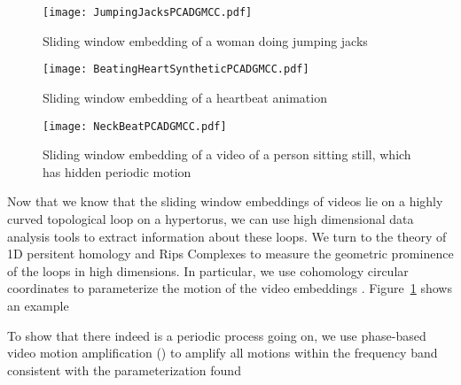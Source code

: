 \documentclass[a4paper,UKenglish]{lipics}
\begin{document}
\begin{figure}[]
	\centering
	\texttt{[image: JumpingJacksPCADGMCC.pdf]}
	\caption{Sliding window embedding of a woman doing jumping jacks}
	\label{fig:JumpingJacks}
\end{figure}

\begin{figure}[]
	\centering
	\texttt{[image: BeatingHeartSyntheticPCADGMCC.pdf]}
	\caption{Sliding window embedding of a heartbeat animation}
	\label{fig:BeatingHeart}
\end{figure}



\begin{figure}[]
	\centering
	\texttt{[image: NeckBeatPCADGMCC.pdf]}
	\caption{Sliding window embedding of a video of a person sitting still, which has hidden periodic motion}
	\label{fig:NeckBeating}
\end{figure}




Now that we know that the sliding window embeddings of videos lie on a highly curved topological loop on a hypertorus, we can use high dimensional data analysis tools to extract information about these loops.  We turn to the theory of 1D persitent homology and Rips Complexes to measure the geometric prominence of the loops in high dimensions.  In particular, we use cohomology circular coordinates to parameterize the motion of the video embeddings \cite{de2011persistent}.  Figure~\ref{fig:JumpingJacks} shows an example

To show that there indeed is a periodic process going on, we use phase-based video motion amplification (\cite{wadhwa2013phase}) to amplify all motions within the frequency band consistent with the parameterization found 










\end{document}
